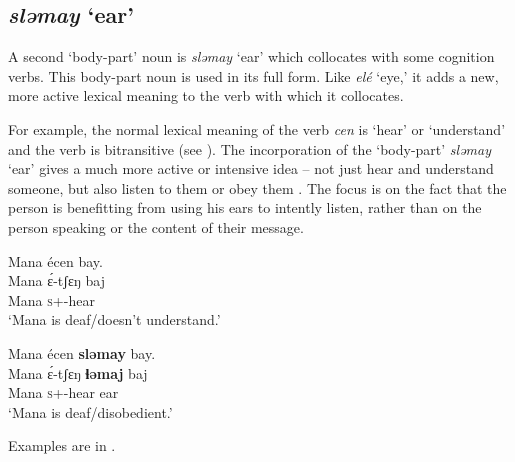 \subsection{\textit{sləmay} ‘ear’}\label{sec:9.3.2}\label{sec:9.3.1.2}

A second ‘body-part’ noun is \textit{sləmay} ‘ear’ which collocates with some cognition verbs.  This body-part noun is used in its full form. Like \textit{elé}  ‘eye,’ it adds a new, more active lexical meaning to the verb with which it collocates. 

For example, the normal lexical meaning of the verb \textit{cen } is ‘hear’ or ‘understand’  and the verb is bitransitive (see ). The incorporation of the ‘body-part’ \textit{sləmay} ‘ear’ gives a much more active or intensive idea -- not just hear and understand someone, but also listen to them or obey them . The focus is on the fact that the person is benefitting from using his ears to intently listen, rather than on the person speaking or the content of their message. 

\ea \label{ex:9:55}
Mana  écen  bay.\\
\gll  Mana   \'{ɛ}-tʃɛŋ     baj\\
      Mana  \textsc{s}+{\IFV}-hear  {\NEG}\\
\glt  ‘Mana is deaf/doesn’t understand.’ 
\z

\ea \label{ex:9:56}
Mana  écen  \textbf{sləmay}  bay.\\
\gll  Mana  \'{ɛ}-tʃɛŋ     \textbf{ɬəmaj}   baj\\
      Mana  \textsc{s}+{\IFV}-hear  ear  {\NEG}\\
\glt  ‘Mana is deaf/disobedient.’
\z

Examples are in .

\begin{table}
\caption{Selected verbs of cognition with and without  sləmay ‘ear’ as direct object\label{tab:77}}
\end{table}


